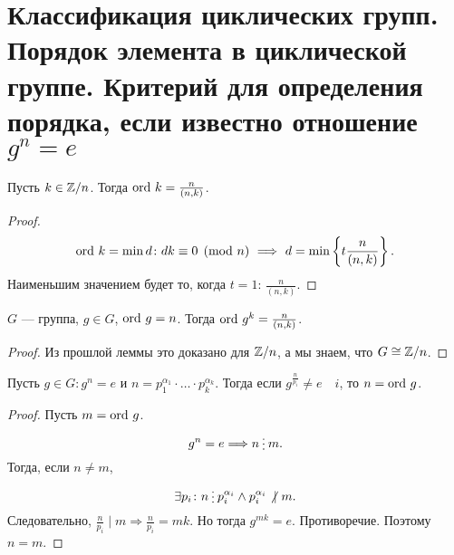 % 
% 
\section{Классификация циклических групп. Порядок элемента в циклической группе. Критерий для определения порядка, если известно отношение $ g^{n}=e$}
\begin{lm}
    Пусть $ k \in  \mathbb{Z} / n$. Тогда $ {\mathop{\text{\rm ord}}}~ k = \frac{n}{(n, k)}$.
\end{lm}
\begin{proof}
    \[
	{\mathop{\text{\rm ord}}}~ k = \min d \colon dk \equiv 0 \pmod n 
	~\Longrightarrow ~
	d = \min \left\{t\frac{n}{(n, k)}\right\} 
    .\] 
    Наименьшим значением будет то, когда $ t=1$:  $ \frac{n}{(n, k)}$.
\end{proof}
\begin{cor}
    $ G$ --- группа, $ g \in G$, $ {\mathop{\text{\rm ord}}}~ g = n$. Тогда   $ {\mathop{\text{\rm ord}}}~ g^{k} = \frac{n}{(n, k)}$.
\end{cor}
\begin{proof}
    Из прошлой леммы это доказано для $ \mathbb{Z} / n$, а мы знаем, что  $ G \cong \mathbb{Z} / n$.
\end{proof}
\begin{lm}
    Пусть $ g \in G \colon g^{n} = e$ и $ n = p_1^{ \alpha _1} \cdot \ldots \cdot p_k^{ \alpha _k}$. Тогда если $ g^{\frac{n}{p_i}} \ne e \quad i$, то $ n = {\mathop{\text{\rm ord}}}~ g$.
\end{lm}
\begin{proof}
    Пусть $ m = {\mathop{\text{\rm ord}}}~ g$. 
     \[
	 g ^{n} = e \Longrightarrow n \del m
    .\] 
    Тогда, если $ n \ne  m$,  
    \[
    \exists p_i \colon n \del p_i^{ \alpha _i} \wedge p_i^{ \alpha _i} \not|~ m
    .\] 
    Следовательно, $ \frac{n}{p_i} \mid m \Longrightarrow \frac{n}{p_i} = mk$. Но тогда $ g^{mk} = e$. Противоречие. Поэтому $ n = m$.
\end{proof}
% 
